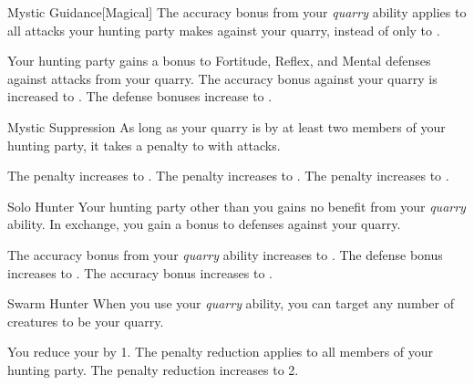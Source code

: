 {            \begin{freeability}{Mystic Guidance}[Magical]
                The accuracy bonus from your \textit{quarry} ability applies to all attacks your hunting party makes against your quarry, instead of only to .

                \rankline
                 Your hunting party gains a  bonus to Fortitude, Reflex, and Mental defenses against attacks from your quarry.
                 The accuracy bonus against your quarry is increased to .
                 The defense bonuses increase to .
            \end{freeability}

            \begin{freeability}{Mystic Suppression}
                As long as your quarry is  by at least two members of your hunting party, it takes a  penalty to  with  attacks.

                \rankline
                 The penalty increases to . 
                 The penalty increases to .
                 The penalty increases to .
            \end{freeability}

            \begin{freeability}{Solo Hunter}
                Your hunting party other than you gains no benefit from your \textit{quarry} ability.
                In exchange, you gain a  bonus to defenses against your quarry.

                \rankline
                 The accuracy bonus from your \textit{quarry} ability increases to .
                 The defense bonus increases to .
                 The accuracy bonus increases to .
            \end{freeability}

            \begin{freeability}{Swarm Hunter}
                When you use your \textit{quarry} ability, you can target any number of creatures to be your quarry.

                \rankline
                 You reduce your  by 1.
                 The penalty reduction applies to all members of your hunting party.
                 The penalty reduction increases to 2.
            \end{freeability}

}
